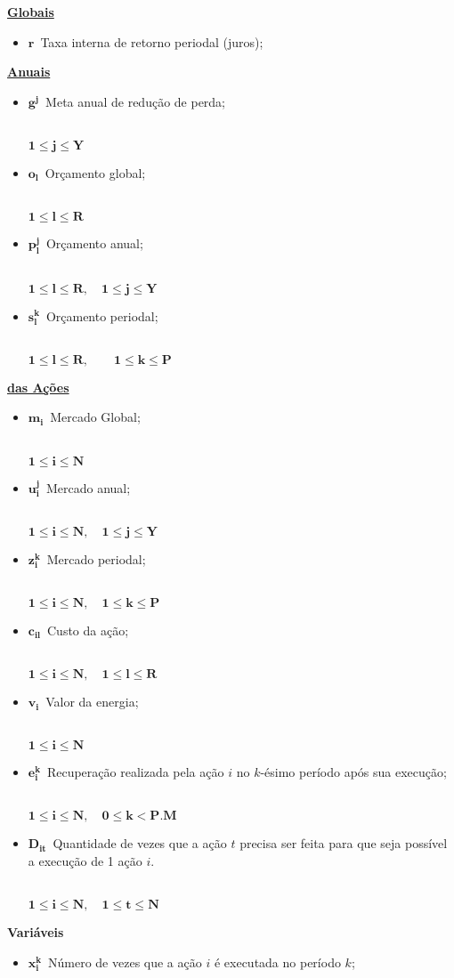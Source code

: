 \documentclass{article}
\newcommand{\topico}[1]{
  \vspace{20pt}
  {\Large \bf #1 }
}
\newcommand{\subtopico}[1]{
  {\large \bf \underline{#1}}
  \\
}
\newcommand{\variavel}[1]{
  { \Large $ \bm{ #1 } \, $}
}
\newcommand{\decorator}[1]{
  {\\ \scriptsize \hspace*{12pt} $ \bm{ #1 } $ }
}
\begin{document}
\begin{multicols}{2}

\subtopico{Globais}
\begin{itemize}
  \item \variavel{r} Taxa interna de retorno periodal (juros);
\end{itemize}

\subtopico{Anuais}
\begin{itemize}
  \item \variavel{g^j} Meta anual de redução de perda;
    \decorator{1 \leq j \leq Y}
  \item \variavel{o_l} Orçamento global;
    \decorator{1 \leq l \leq R}
  \item \variavel{p_l^j} Orçamento anual;
    \decorator{1 \leq l \leq R, \quad 1 \leq j \leq Y}
  \item \variavel{s_l^{k}} Orçamento periodal;
    \decorator{1 \leq l \leq R, \quad \quad 1 \leq k \leq P}
\end{itemize}

\vfill \columnbreak

\subtopico{das Ações}
\begin{itemize}
  \item \variavel{m_i} Mercado Global;
    \decorator{1 \leq i \leq N}
  \item \variavel{u_i^j} Mercado anual;
    \decorator{1 \leq i \leq N, \quad 1 \leq j \leq Y}
  \item \variavel{z_i^k} Mercado periodal;
    \decorator{1 \leq i \leq N, \quad 1 \leq k \leq P}
  \item \variavel{c_{il}} Custo da ação;
    \decorator{1 \leq i \leq N, \quad 1 \leq l \leq R}
  \item \variavel{v_i} Valor da energia;
    \decorator{1 \leq i \leq N}
  \item \variavel{e_i^k} Recuperação realizada pela ação $i$ no $k$-ésimo período
    após sua execução;
    \decorator{1 \leq i \leq N, \quad 0 \leq k < P.M}
  \item \variavel{D_{it}} Quantidade de vezes que a ação $t$ precisa ser
  	feita para que seja possível a execução de 1 ação $i$.
    \decorator{1 \leq i \leq N, \quad 1 \leq t \leq N}
\end{itemize}

\end{multicols}

\pagebreak

\topico{Variáveis}
\begin{itemize}
  \item \variavel{x_i^k} Número de vezes que a ação $i$ é executada no período $k$;
\end{itemize}
\end{document}
